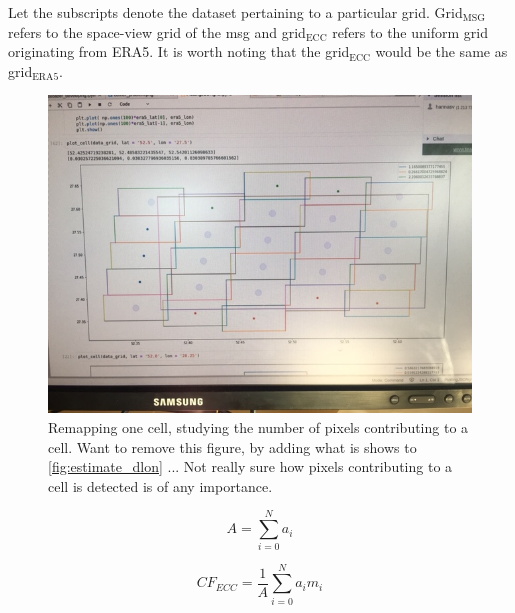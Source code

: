 Let the subscripts denote the dataset pertaining to a particular grid. Grid$_{\text{MSG}}$ refers to the space-view grid of the \acrlong{msg} and grid$_{\text{ECC}}$ refers to the uniform grid originating from ERA5. It is worth noting that the grid$_{\text{ECC}}$ would be the same as grid$_{\text{ERA5}}$.
\begin{figure}
    \centering
    \includegraphics[scale = 0.6]{Chapter4_Results/figurs/remapping-pixels.JPG}
    \caption{Remapping one cell, studying the number of pixels contributing to a cell. Want to remove this figure, by adding what is shows to \ref{fig:estimate_dlon} ...  Not really sure how pixels contributing to a cell is detected is of any importance.} 
    \label{fig:pixels_contributing_to_cell.}
\end{figure}

\begin{equation} \label{eq:tot_area}
    A = \sum_{i=0}^{N} a_i
\end{equation}

\begin{equation} \label{eq:area_weighting}
    CF_{ECC} = \frac{1}{A} \sum_{i=0}^{N} a_i m_i
\end{equation}


